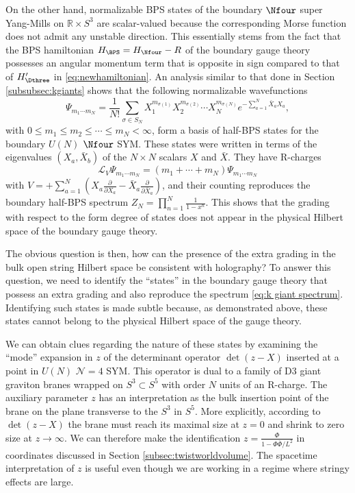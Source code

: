 \documentclass[a4paper,12pt]{article}
\begin{document}
On the other hand, normalizable BPS states of the boundary $\Nfour$ super Yang-Mills on $\mathbb{R} \times S^3$ are scalar-valued because the corresponding Morse function does not admit any unstable direction. This essentially stems from the fact that the BPS hamiltonian $H_\BPS = H_\Nfour - R$ of the boundary gauge theory possesses an angular momentum term that is opposite in sign compared to that of $H_\Dthree'$ in \eqref{eq:newhamiltonian}. An analysis similar to that done in Section \ref{subsubsec:kgiants} shows that the following normalizable wavefunctions
\begin{equation}
\Psi_{m_1 \cdots m_N} = \frac{1}{N!} \sum_{\sigma \in S_N} X_1^{m_{\sigma(1)}} X_2^{m_{\sigma(2)}} \cdots X_N^{m_{\sigma(N)}}  e^{-\sum_{a=1}^N \bar{X}_a X_a},
\end{equation}
with $0 \leq m_1 \leq m_2 \leq \cdots \leq m_N <\infty$, form a basis of half-BPS states for the boundary $U(N)$ $\Nfour$ SYM. These states were written in terms of the eigenvalues $(X_a, \bar{X}_b)$ of the $N \times N$ scalars $X$ and $\bar{X}$. They have R-charges
\begin{equation}
\mathcal{L}_V \Psi_{m_1 \cdots m_N} = (m_1 + \cdots + m_N) \Psi_{m_1 \cdots m_N}
\end{equation}
with $V = + \sum_{a=1}^N \left( X_a \frac{\partial}{\partial X_a} - \bar{X}_a \frac{\partial}{\partial \bar{X}_a} \right)$, and their counting reproduces the boundary half-BPS spectrum $Z_N = \prod_{n=1}^N \frac{1}{1 - x^n}$. This shows that the grading with respect to the form degree of states does not appear in the physical Hilbert space of the boundary gauge theory.

The obvious question is then, how can the presence of the extra grading in the bulk open string Hilbert space be consistent with holography? To answer this question, we need to identify the ``states'' in the boundary gauge theory that possess an extra grading and also reproduce the spectrum \eqref{eq:k giant spectrum}. Identifying such states is made subtle because, as demonstrated above, these states cannot belong to the physical Hilbert space of the gauge theory.

We can obtain clues regarding the nature of these states by examining the ``mode'' expansion in $z$ of the determinant operator $\det (z - X)$ inserted at a point in $U(N)$ $\mathcal{N}=4$ SYM. This operator is dual to a family of D3 giant graviton branes wrapped on $S^3 \subset S^5$ with order $N$ units of an R-charge. The auxiliary parameter $z$ has an interpretation as the bulk insertion point of the brane on the plane transverse to the $S^3$ in $S^5$. More explicitly, according to $\det (z - X)$ the brane must reach its maximal size at $z=0$ and shrink to zero size at $z \to \infty$. We can therefore make the identification $z = \frac{\Phi}{1 - \Phi \bar{\Phi}/L^2}$ in coordinates discussed in Section \ref{subsec:twistworldvolume}. The spacetime interpretation of $z$ is useful even though we are working in a regime where stringy effects are large.
\end{document}

